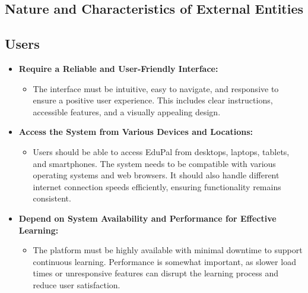 \subsection{Nature and Characteristics of External Entities}

\subsection*{Users}
\begin{itemize}
    \item \textbf{Require a Reliable and User-Friendly Interface:}
          \begin{itemize}
              \item The interface must be intuitive, easy to navigate, and responsive to ensure a positive user experience. This includes clear instructions, accessible features, and a visually appealing design.
          \end{itemize}
    \item \textbf{Access the System from Various Devices and Locations:}
          \begin{itemize}
              \item Users should be able to access EduPal from desktops, laptops, tablets, and smartphones. The system needs to be compatible with various operating systems and web browsers. It should also handle different internet connection speeds efficiently, ensuring functionality remains consistent.
          \end{itemize}
    \item \textbf{Depend on System Availability and Performance for Effective Learning:}
          \begin{itemize}
              \item The platform must be highly available with minimal downtime to support continuous learning. Performance is somewhat important, as slower load times or unresponsive features can disrupt the learning process and reduce user satisfaction.
          \end{itemize}
\end{itemize}

